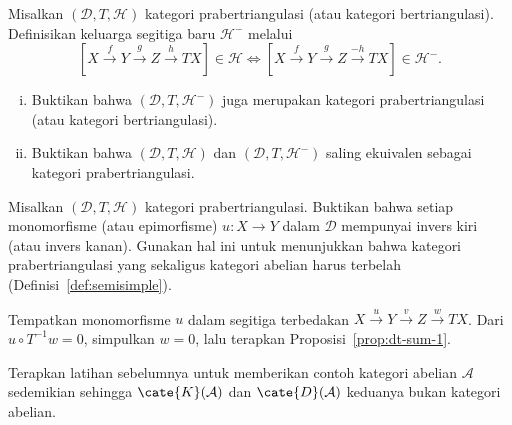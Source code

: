 \begin{Exercises}
	\item Misalkan $(\mathcal{D}, T, \mathcal{H})$ kategori prabertriangulasi
	(atau kategori bertriangulasi). Definisikan keluarga segitiga baru
	$\mathcal{H}^-$ melalui
	\[ [X \xrightarrow{f} Y \xrightarrow{g} Z \xrightarrow{h} TX] \in \mathcal{H} \iff [X \xrightarrow{f} Y \xrightarrow{g} Z \xrightarrow{-h} TX] \in \mathcal{H}^- . \]
	\begin{enumerate}[(i)]
		\item Buktikan bahwa $(\mathcal{D},T,\mathcal{H}^-)$ juga merupakan
		kategori prabertriangulasi (atau kategori bertriangulasi).
		\item Buktikan bahwa $(\mathcal{D},T,\mathcal{H})$ dan
		$(\mathcal{D},T,\mathcal{H}^-)$ saling ekuivalen sebagai kategori
		prabertriangulasi.
	\end{enumerate}

	\item Misalkan $(\mathcal{D},T,\mathcal{H})$ kategori prabertriangulasi.
	Buktikan bahwa setiap monomorfisme (atau epimorfisme) $u:X\to Y$ dalam
	$\mathcal{D}$ mempunyai invers kiri (atau invers kanan). Gunakan hal ini
	untuk menunjukkan bahwa kategori prabertriangulasi yang sekaligus kategori
	abelian harus terbelah (Definisi~\ref{def:semisimple}).
	
	\begin{hint}
		Tempatkan monomorfisme $u$ dalam segitiga terbedakan
		$X\xrightarrow{u}Y\xrightarrow{v}Z\xrightarrow{w}TX$. Dari
		$u\circ T^{-1}w=0$, simpulkan $w=0$, lalu terapkan
		Proposisi~\ref{prop:dt-sum-1}.
	\end{hint}

	\item Terapkan latihan sebelumnya untuk memberikan contoh kategori abelian
	$\mathcal{A}$ sedemikian sehingga $\cate{K}(\mathcal{A})$ dan
	$\cate{D}(\mathcal{A})$ keduanya bukan kategori abelian.


\end{Exercises}
